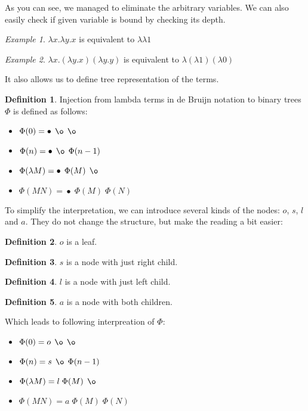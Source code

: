 \documentclass[final]{article}
\theoremstyle{definition}
\newtheorem{definition}{Definition}[subsection]
\theoremstyle{remark}
\newtheorem{example}{Example}[subsection]
\DeclareMathOperator{\n}{\bullet}
\DeclareMathOperator{\no}{\o}
\begin{document}
As you can see, we managed to eliminate the arbitrary variables. We can also easily check if given variable is bound by checking its depth.

\begin{example}
    \(\lambda x . \lambda y . x\) is equivalent to \(\lambda \lambda 1\)
\end{example}

\begin{example}
    \(\lambda x . (\lambda y . x) (\lambda y . y)\) is equivalent to \(\lambda (\lambda 1) (\lambda 0)\)
\end{example}

It also allows us to define tree representation of the terms.

\begin{definition}
    Injection from lambda terms in de Bruijn notation to binary trees \(\Phi\) is defined as follows:
    \begin{itemize}
        \item \(\Phi(0) = \n\; \no\; \no\)
        \item \(\Phi(n) = \n\; \no\; \Phi(n - 1)\)
        \item \(\Phi(\lambda M) = \n\; \Phi(M)\; \no\)
        \item \(\Phi(M N) = \n\; \Phi(M)\; \Phi(N)\)
    \end{itemize}
\end{definition}

To simplify the interpretation, we can introduce several kinds of the nodes: \(o\), \(s\), \(l\) and \(a\). They do not change the structure, but make the reading a bit easier:

\begin{definition}
    \(o\) is a leaf.
\end{definition}

\begin{definition}
    \(s\) is a node with just right child.
\end{definition}

\begin{definition}
    \(l\) is a node with just left child.
\end{definition}

\begin{definition}
    \(a\) is a node with both children.
\end{definition}

Which leads to following interpreation of \(\Phi\):

\begin{itemize}
    \item \(\Phi(0) = o\; \no\; \no\)
    \item \(\Phi(n) = s\; \no\; \Phi(n - 1)\)
    \item \(\Phi(\lambda M) = l\; \Phi(M)\; \no\)
    \item \(\Phi(M N) = a\; \Phi(M)\; \Phi(N)\)
\end{itemize}
\end{document}
